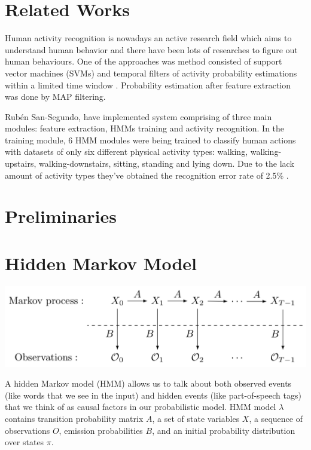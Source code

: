 \documentclass[10pt,twocolumn,letterpaper]{article}
\begin{document}
\section{Related Works}
Human activity recognition is nowadays an active research field which aims to understand human behavior and there have been lots of researches to figure out human behaviours. One of the approaches was method consisted of support vector machines (SVMs) and temporal filters of activity probability estimations within a limited time window \cite{haptpaper}. Probability estimation after feature extraction was done by MAP filtering.

Rubén San-Segundo, \etal have implemented system comprising of three main modules: feature extraction, HMMs training and activity recognition. In the training module, 6 HMM modules were being trained to classify human actions with datasets of only six different physical activity types: walking, walking-upstairs, walking-downstairs, sitting, standing and lying down. Due to the lack amount of activity types they've obtained the recognition error rate of 2.5\% \cite{monitoring}.

\section{Preliminaries}

\section{Hidden Markov Model}

\begin{center}
\includegraphics[width=1.0\linewidth]{./HMM.png}
\end{center}

A hidden Markov model (HMM) allows us to talk about both observed events (like words that we see in the input) and hidden events (like part-of-speech tags) that we think of as causal factors in our probabilistic model. HMM model $\lambda$ contains transition probability matrix $A$, a set of state variables $X$, a sequence of observations $O$, emission probabilities $B$, and an initial probability distribution over states $\pi$.
\end{document}
